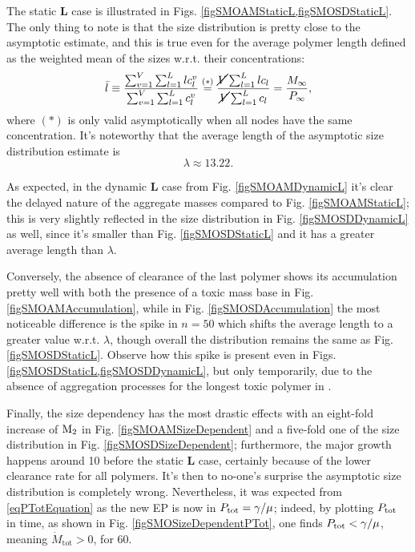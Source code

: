 \documentclass{article}
\begin{document}
                The static $\mathbf L$ case is illustrated in Figs. \cref{figSMOAMStaticL,figSMOSDStaticL}. The only thing to note is that the size distribution is pretty close to the asymptotic estimate, and this is true even for the average polymer length defined as the weighted mean of the sizes w.r.t. their concentrations:
                \begin{equation}
                    \bar l\equiv
                    \frac{\sum_{v=1}^V\sum_{l=1}^Llc_l^v}{\sum_{v=1}^V\sum_{l=1}^Lc_l^v}
                    \overset{(*)}{=}
                    \frac{\cancel V\sum_{l=1}^Llc_l}{\cancel V\sum_{l=1}^Lc_l}
                    =\frac{M_\infty}{P_\infty},
                    \label{eqAverageLength}
                \end{equation}
                where $(*)$ is only valid asymptotically when all nodes have the same concentration. It's noteworthy that the average length of the asymptotic size distribution estimate is \[\lambda\approx\num{13.22}.\]
                
                As expected, in the dynamic $\mathbf L$ case from Fig. \ref{figSMOAMDynamicL} it's clear the delayed nature of the aggregate masses compared to Fig. \ref{figSMOAMStaticL}; this is very slight\-ly reflected in the size distribution in Fig. \ref{figSMOSDDynamicL} as well, since it's smaller than Fig. \ref{figSMOSDStaticL} and it has a greater average length than $\lambda$.
                
                Conversely, the absence of clearance of the last polymer shows its accumulation pretty well with both the presence of a toxic mass base in Fig. \ref{figSMOAMAccumulation}, while in Fig. \ref{figSMOSDAccumulation} the most noticeable difference is the spike in $n=50$ which shifts the average length to a greater value w.r.t. $\lambda$, though overall the distribution remains the same as Fig. \ref{figSMOSDStaticL}. Observe how this spike is present even in Figs. \cref{figSMOSDStaticL,figSMOSDDynamicL}, but only temporarily, due to the absence of aggregation processes for the longest toxic polymer in \SMOdiscrete{}.
                
                Finally, the size dependency has the most drastic effects with an eight-fold increase of $\text{M}_2$ in Fig. \ref{figSMOAMSizeDependent} and a five-fold one of the size distribution in Fig. \ref{figSMOSDSizeDependent}; furthermore, the major growth happens around \qty{10}{\year} before the static $\mathbf L$ case, certainly because of the lower clearance rate for all polymers. It's then to no-one's surprise the asymptotic size distribution is completely wrong.  Nevertheless, it was expected from \eqref{eqPTotEquation} as the new EP is now in $P_{\text{tot}}=\gamma/\mu$; indeed, by plotting $P_{\text{tot}}$ in time, as shown in Fig. \ref{figSMOSizeDependentPTot}, one finds $P_{\text{tot}}<\gamma/\mu$, meaning $\dot M_{\text{tot}}>0$, for \qty{60}{\year}.
                
\end{document}
